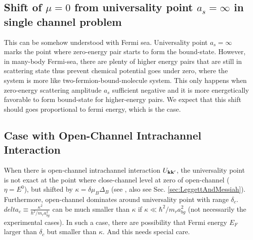 \subsection{Shift of $\mu=0$ from universality point $a_s=\infty$ in single channel problem}
This can be somehow understood with Fermi sea. Universality point $a_s=\infty$ marks the point where zero-energy pair starts to form the bound-state.  However, in many-body Fermi-sea, there are plenty of higher energy pairs that are still in scattering state thus prevent chemical potential goes under zero, where the system is more like two-fermion-bound-molecule system.  This only happens when zero-energy scattering amplitude $a_s$ sufficient negative and it is more energetically favorable to form bound-state for higher-energy pairs.  We expect that this shift should goes proportional to fermi energy, which is the case.  

\subsection{Case with Open-Channel Intrachannel Interaction}
When there is open-channel intrachannel interaction $U_{\mathbf{k}\mathbf{k}'}$, the universality point is not exact at the point where close-channel level at zero of open-channel ($\eta=E^0$), but shifted by $\kappa=\delta\mu_B\Delta_B$ (see \cite{Leggett}, also see Sec. \ref{sec:LeggettAndMessiah}).  Furthermore, open-channel dominates around universality point with range $\delta_c$.  $delta_c\equiv\frac{\kappa^2}{\hbar^2/m_ra_{bg}^2}$ can be much smaller than $\kappa$ if $\kappa\ll\hbar^2/m_ra_{bg}^2$ (not necessarily the experimental cases).  In such a case, there are possibility that Fermi energy $E_F$ larger than $\delta_c$ but smaller than $\kappa$.  And this needs special care.  